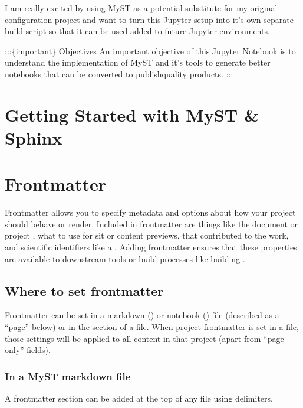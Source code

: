 \documentclass[letterpaper,12pt,english]{sphinxmanual}
\begin{document}
\sphinxAtStartPar
I am really excited by using MyST as a potential substitute for my original  configuration project and want to turn this Jupyter setup into it’s own separate build script so that it can be used added to future Jupyter environments.

\sphinxAtStartPar
:::\{important\} Objectives
An important objective of this Jupyter Notebook is to understand the implementation of MyST and it’s tools to generate better notebooks that can be converted to publish\sphinxhyphen{}quality products.
:::


\chapter{Getting Started with MyST \& Sphinx}
\label{\detokenize{notebooks/02-myst.integration:getting-started-with-myst-sphinx}}

\chapter{Frontmatter}
\label{\detokenize{notebooks/02-myst.integration:frontmatter}}
\sphinxAtStartPar
Frontmatter allows you to specify metadata and options about how your project should behave or render. Included in frontmatter are things like the document or project , what  to use for sit or content previews,  that contributed to the work, and scientific identifiers like a . Adding frontmatter ensures that these properties are available to downstream tools or build processes like building .


\section{Where to set frontmatter}
\label{\detokenize{notebooks/02-myst.integration:where-to-set-frontmatter}}
\sphinxAtStartPar
Frontmatter can be set in a markdown () or notebook () file (described as a “page” below) or in the  section of a  file. When project frontmatter is set in a  file, those settings will be applied to all content in that project (apart from “page only” fields).


\subsection{In a MyST markdown file}
\label{\detokenize{notebooks/02-myst.integration:in-a-myst-markdown-file}}
\sphinxAtStartPar
A frontmatter section can be added at the top of any  file using \sphinxcode{\sphinxupquote{\sphinxhyphen{}\sphinxhyphen{}\sphinxhyphen{}}} delimiters.
\end{document}
